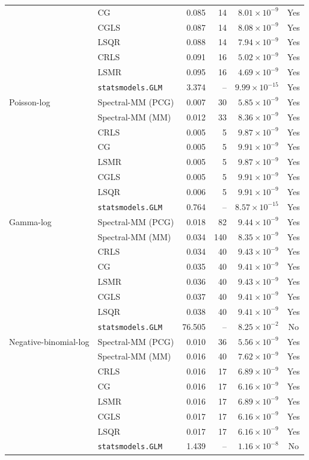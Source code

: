 \begin{longtable}{llrrrc}
 & CG & 0.085 & 14 & $8.01\times10^{-9}$ & Yes \\
 & CGLS & 0.087 & 14 & $8.08\times10^{-9}$ & Yes \\
 & LSQR & 0.088 & 14 & $7.94\times10^{-9}$ & Yes \\
 & CRLS & 0.091 & 16 & $5.02\times10^{-9}$ & Yes \\
 & LSMR & 0.095 & 16 & $4.69\times10^{-9}$ & Yes \\
 & \texttt{statsmodels.GLM} & 3.374 & -- & $9.99\times10^{-15}$ & Yes \\
\midrule
Poisson-log & Spectral-MM (PCG) & 0.007 & 30 & $5.85\times10^{-9}$ & Yes \\
 & Spectral-MM (MM) & 0.012 & 33 & $8.36\times10^{-9}$ & Yes \\
 & CRLS & 0.005 & 5 & $9.87\times10^{-9}$ & Yes \\
 & CG & 0.005 & 5 & $9.91\times10^{-9}$ & Yes \\
 & LSMR & 0.005 & 5 & $9.87\times10^{-9}$ & Yes \\
 & CGLS & 0.005 & 5 & $9.91\times10^{-9}$ & Yes \\
 & LSQR & 0.006 & 5 & $9.91\times10^{-9}$ & Yes \\
 & \texttt{statsmodels.GLM} & 0.764 & -- & $8.57\times10^{-15}$ & Yes \\
\midrule
Gamma-log & Spectral-MM (PCG) & 0.018 & 82 & $9.44\times10^{-9}$ & Yes \\
 & Spectral-MM (MM) & 0.034 & 140 & $8.35\times10^{-9}$ & Yes \\
 & CRLS & 0.034 & 40 & $9.43\times10^{-9}$ & Yes \\
 & CG & 0.035 & 40 & $9.41\times10^{-9}$ & Yes \\
 & LSMR & 0.036 & 40 & $9.43\times10^{-9}$ & Yes \\
 & CGLS & 0.037 & 40 & $9.41\times10^{-9}$ & Yes \\
 & LSQR & 0.038 & 40 & $9.41\times10^{-9}$ & Yes \\
 & \texttt{statsmodels.GLM} & 76.505 & -- & $8.25\times10^{-2}$ & No \\
\midrule
Negative-binomial-log & Spectral-MM (PCG) & 0.010 & 36 & $5.56\times10^{-9}$ & Yes \\
 & Spectral-MM (MM) & 0.016 & 40 & $7.62\times10^{-9}$ & Yes \\
 & CRLS & 0.016 & 17 & $6.89\times10^{-9}$ & Yes \\
 & CG & 0.016 & 17 & $6.16\times10^{-9}$ & Yes \\
 & LSMR & 0.016 & 17 & $6.89\times10^{-9}$ & Yes \\
 & CGLS & 0.017 & 17 & $6.16\times10^{-9}$ & Yes \\
 & LSQR & 0.017 & 17 & $6.16\times10^{-9}$ & Yes \\
 & \texttt{statsmodels.GLM} & 1.439 & -- & $1.16\times10^{-8}$ & No \\
\end{longtable}
